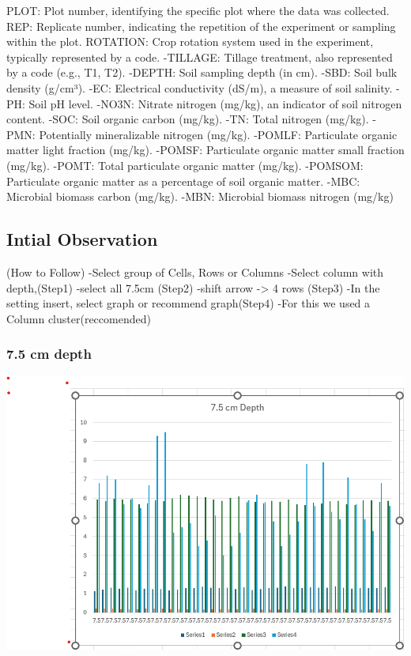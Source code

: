 \documentclass[
  letterpaper,
  DIV=11,
  numbers=noendperiod]{scrreprt}
\begin{document}
PLOT: Plot number, identifying the specific plot where the data was
collected. REP: Replicate number, indicating the repetition of the
experiment or sampling within the plot. ROTATION: Crop rotation system
used in the experiment, typically represented by a code. -TILLAGE:
Tillage treatment, also represented by a code (e.g., T1, T2). -DEPTH:
Soil sampling depth (in cm). -SBD: Soil bulk density (g/cm³). -EC:
Electrical conductivity (dS/m), a measure of soil salinity. -PH: Soil pH
level. -NO3N: Nitrate nitrogen (mg/kg), an indicator of soil nitrogen
content. -SOC: Soil organic carbon (mg/kg). -TN: Total nitrogen (mg/kg).
-PMN: Potentially mineralizable nitrogen (mg/kg). -POMLF: Particulate
organic matter light fraction (mg/kg). -POMSF: Particulate organic
matter small fraction (mg/kg). -POMT: Total particulate organic matter
(mg/kg). -POMSOM: Particulate organic matter as a percentage of soil
organic matter. -MBC: Microbial biomass carbon (mg/kg). -MBN: Microbial
biomass nitrogen (mg/kg)

\subsection{Intial Observation}\label{intial-observation}

(How to Follow) -Select group of Cells, Rows or Columns -Select column
with depth,(Step1) -select all 7.5cm (Step2) -shift arrow
-\textgreater{} 4 rows (Step3) -In the setting insert, select graph or
recommend graph(Step4) -For this we used a Column cluster(reccomended)

\subsubsection{7.5 cm depth}\label{cm-depth}

\includegraphics{./Excel_1_Unit/Week1_Diego/Week_1DJ/screenshots/Soil1.png}
\end{document}
